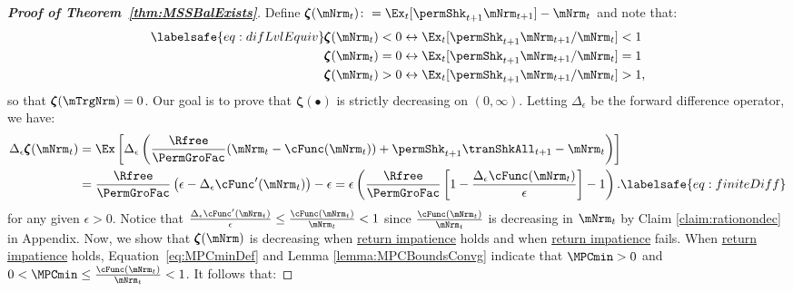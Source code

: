 \documentclass[\econtexRoot/BufferStockTheory]{subfiles}
\begin{document}
\begin{proof}[\textbf{Proof of Theorem~\ref{thm:MSSBalExists}}]

Define \providecommand{\difFunc}{\pmb{\zeta}} $\difFunc(\mNrm_t) \colon = 
\Ex_t[\permShk_{t+1}\mNrm_{t+1}] - \mNrm_t$ and note that:
\begin{align}\labelsafe{eq:difLvlEquiv}
  \difFunc(\mNrm_t) < 0 &\leftrightarrow \Ex_t[\permShk_{t+1}\mNrm_{t+1}/\mNrm_{t}] < 1 
                          \nonumber\\
  \difFunc(\mNrm_t) = 0 &\leftrightarrow \Ex_t[\permShk_{t+1}\mNrm_{t+1}/\mNrm_{t}] = 1\\
  \difFunc(\mNrm_t) > 0 &\leftrightarrow \Ex_t[\permShk_{t+1}\mNrm_{t+1}/\mNrm_{t}] > 
                          1,\nonumber
\end{align}
so that $\difFunc(\mTrgNrm)=0$.
Our goal is to prove that $\difFunc(\bullet)$ is strictly 
decreasing on $(0,\infty)$. Letting $\Delta_{\epsilon}$ be the forward difference operator, we have:
%
\begin{align}
  \Delta_{\epsilon}\difFunc(\mNrm_{t}) & 			= \Ex\left[
                                                                                              \Delta_{\epsilon} \left( 
                                                                                               \frac{\Rfree}{\PermGroFac}(\mNrm_{t}-\cFunc(\mNrm_{t}))+%
                                                                                               {\permShk}_{t+1}{\tranShkAll}_{t+1} - {\mNrm}_t\right) \right] \notag \\
                                                                                             & = \frac{\Rfree}{\PermGroFac}\left( \epsilon-
                                                       \Delta_{\epsilon}\cFunc^{\prime}({\mNrm}_t)\right) - \epsilon = \epsilon\left(  \frac{\Rfree}{\PermGroFac}\left[1-
                                                       \frac{\Delta_{\epsilon}\cFunc({\mNrm}_t)}{\epsilon}\right]- 1\right). \labelsafe{eq:finiteDiff}
\end{align}
%
for any given $\epsilon>0$. Notice  that $\frac{\Delta_{\epsilon}\cFunc^{\prime}({\mNrm}_t)}{\epsilon} \leq \frac{\cFunc(\mNrm_{t})}{\mNrm_{t}}<1$ since $\frac{\cFunc(\mNrm_{t})}{\mNrm_{t}}$ is decreasing in $\mNrm_{t}$ by Claim \ref{claim:rationondec} in Appendix. Now, we show that $\difFunc(\mNrm)$ is decreasing when \hyperlink{RIC}{return impatience} holds and when \hyperlink{RIC}{return impatience} fails.  When \hyperlink{RIC}{return impatience} holds,  Equation~\eqref{eq:MPCminDef} and Lemma \ref{lemma:MPCBoundsConvg} indicate that $\MPCmin >0$ and $0 < \MPCmin \leq \frac{\cFunc(\mNrm_{t})}{\mNrm_{t}} < 1$. It follows that:

\end{proof}
\end{document}
